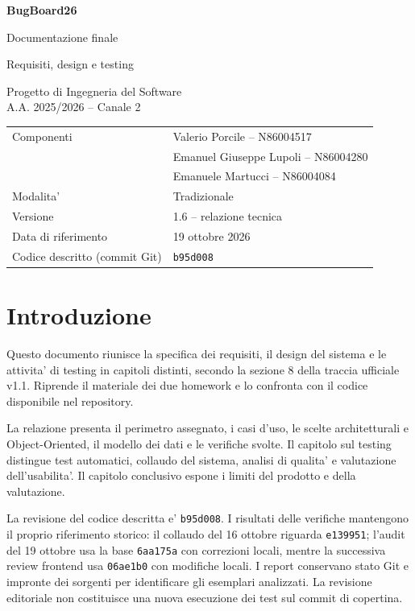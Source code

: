 \documentclass[11pt,a4paper,oneside]{report}
\begin{document}
\hypersetup{pageanchor=false}
\begin{titlepage}
\centering
\vspace*{2cm}
{\Huge\bfseries BugBoard26\par}
\vspace{0.6cm}
{\LARGE Documentazione finale\par}
\vspace{0.6cm}
{\large Requisiti, design e testing\par}
\vspace{1cm}
Progetto di Ingegneria del Software\\A.A. 2025/2026 -- Canale 2
\vfill
\begin{tabular}{ll}
Componenti & Valerio Porcile -- N86004517\\
 & Emanuel Giuseppe Lupoli -- N86004280\\
 & Emanuele Martucci -- N86004084\\
Modalita' & Tradizionale\\
Versione & 1.6 -- relazione tecnica\\
Data di riferimento & 19 ottobre 2026\\
Codice descritto (commit Git) & \texttt{b95d008}\\
\end{tabular}
\vfill
\end{titlepage}
\hypersetup{pageanchor=true}

\chapter*{Introduzione}
Questo documento riunisce la specifica dei requisiti, il design del sistema
e le attivita' di testing in capitoli distinti, secondo la sezione 8 della
traccia ufficiale v1.1. Riprende il materiale dei due homework e lo confronta
con il codice disponibile nel repository.

La relazione presenta il perimetro assegnato, i casi d'uso, le scelte
architetturali e Object-Oriented, il modello dei dati e le verifiche svolte.
Il capitolo sul testing distingue test automatici, collaudo del sistema,
analisi di qualita' e valutazione dell'usabilita'. Il capitolo conclusivo
espone i limiti del prodotto e della valutazione.

La revisione del codice descritta e' \texttt{b95d008}. I risultati delle
verifiche mantengono il proprio riferimento storico: il collaudo del
16 ottobre riguarda \texttt{e139951}; l'audit del 19 ottobre usa la base
\texttt{6aa175a} con correzioni locali, mentre la successiva review frontend
usa \texttt{06ae1b0} con modifiche locali. I report conservano stato Git e
impronte dei sorgenti per identificare gli esemplari analizzati. La revisione
editoriale non costituisce una nuova esecuzione dei test sul commit di
copertina.
\end{document}
